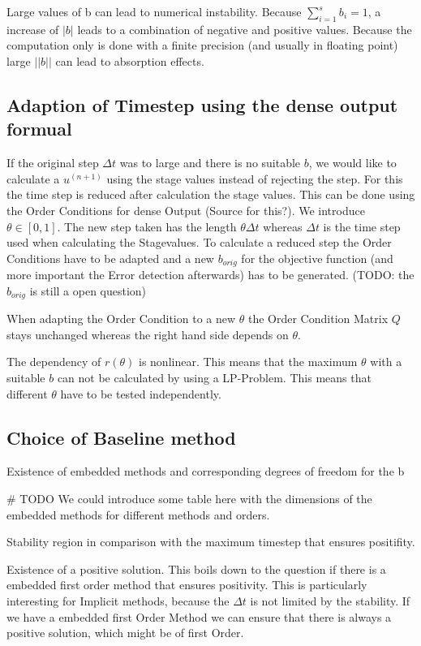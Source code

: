 \documentclass{article}
\begin{document}
Large values of b can lead to numerical instability. Because $\sum_{i  = 1}^s b_i = 1$, a increase of $|b|$ leads to a combination of negative and positive values. Because the computation only is done with a finite precision (and usually in floating point) large $||b||$ can lead to absorption effects.    

\subsection{Adaption of Timestep using the dense output formual}

If the original step $\Delta t$ was to large and there is no suitable $b$, we would like to calculate a $u^(n+1)$ using the stage values instead of rejecting the step. For this the time step is reduced after calculation the stage values. This can be done using the Order Conditions for dense Output (Source for this?).
We introduce $\theta \in [0,1]$. The new step taken has the length $\theta \Delta t$ whereas $\Delta t$ is the time step used when calculating the Stagevalues.
To calculate a reduced step the Order Conditions have to be adapted and a new $b_{orig}$ for the objective function (and more important the Error detection afterwards) has to be generated. 
(TODO: the $b_{orig}$ is still a open question)

When adapting the Order Condition to a new $\theta$ the Order Condition Matrix $Q$ stays unchanged whereas the right hand side depends on $\theta$.

The dependency of $r(\theta)$ is nonlinear. This means that the maximum $\theta$ with a suitable $b$ can not be calculated by using a LP-Problem. This means that different $\theta$ have to be tested independently. 


\subsection{Choice of Baseline method}

Existence of embedded methods and corresponding degrees of freedom for the b

\# TODO We could introduce some table here with the dimensions of the embedded methods for different methods and orders.

Stability region in comparison with the maximum timestep that ensures positifity. 

Existence of a positive solution. This boils down to the question if there is a embedded first order method that ensures positivity. This is particularly interesting for Implicit methods, because the $\Delta t$ is not limited by the stability. 
If we have a embedded first Order Method we can ensure that there is always a positive solution, which might be of first Order. 
\end{document}
